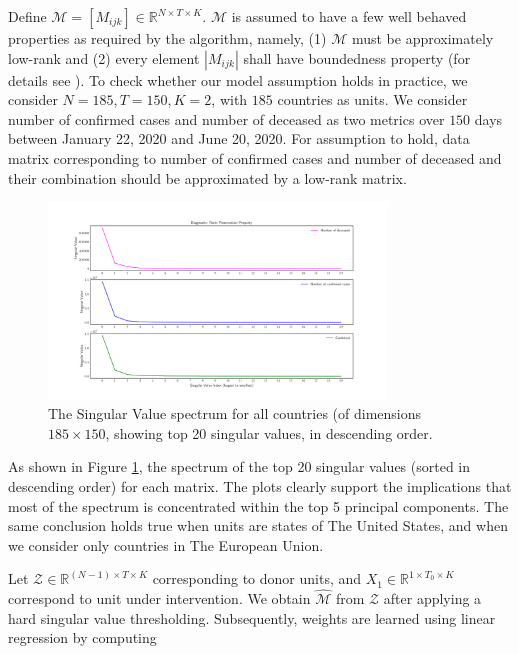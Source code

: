 \documentclass[preprint,authoryear,12pt]{elsarticle}
\begin{document}
	Define $\mathcal{M} = [M_{ijk}] \in \mathbb{R}^{N \times T \times K}$. $\mathcal{M}$ is assumed to have a few well behaved properties as required by the algorithm, namely, (1) $\mathcal{M} $ must be approximately low-rank and (2) every element $\left|M_{ijk}\right|$ shall have boundedness property (for details see \cite{AMSS19}). To check whether our model assumption holds in practice, we consider $N=185, T=150, K=2$, with $185$ countries as units. We consider number of confirmed cases and number of deceased as two metrics over $150$ days between January 22, 2020 and June 20, 2020. For assumption to hold, data matrix corresponding to number of confirmed cases and number of deceased and their combination should be approximated by a low-rank matrix. 
	
	\begin{figure}
		\centering
		\includegraphics[width=0.8\textwidth]{rd}
		\caption{The Singular Value spectrum for all countries (of dimensions $185 \times 150$, showing top 20 singular values, in descending order.} 
		\label{fig1} 
	\end{figure}
	
	As shown in Figure \ref{fig1}, the spectrum of the top 20 singular values (sorted in descending order) for each matrix. The plots clearly support the implications that most of the spectrum is concentrated within the top 5 principal components. The same conclusion holds true when units are states of The United States, and when we consider only countries in The  European Union.\par
	
	Let $\mathcal{Z} \in \mathbb{R}^{(N-1) \times T \times K}$ corresponding to donor units, and $X_1 \in \mathbb{R}^{1 \times T_0 \times K}$ correspond to unit under intervention. We obtain $\hat{\mathcal{M}}$ from $\mathcal{Z}$ after applying a hard singular value thresholding. Subsequently, weights are learned using linear regression by computing
	
\end{document}
